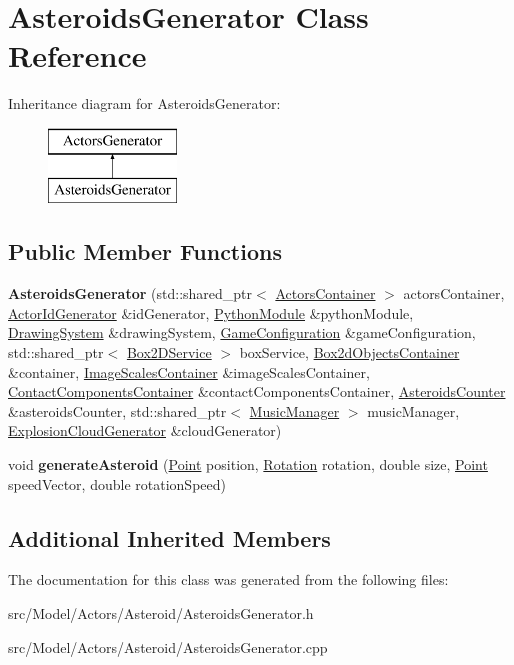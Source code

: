 \hypertarget{classAsteroidsGenerator}{}\section{Asteroids\+Generator Class Reference}
\label{classAsteroidsGenerator}
Inheritance diagram for Asteroids\+Generator\+:\begin{figure}[H]
\begin{center}
\leavevmode
\includegraphics[height=2.000000cm]{classAsteroidsGenerator}
\end{center}
\end{figure}
\subsection*{Public Member Functions}
\begin{DoxyCompactItemize}
\item 
{\bfseries Asteroids\+Generator} (std\+::shared\+\_\+ptr$<$ \hyperlink{classActorsContainer}{Actors\+Container} $>$ actors\+Container, \hyperlink{classActorIdGenerator}{Actor\+Id\+Generator} \&id\+Generator, \hyperlink{classPythonModule}{Python\+Module} \&python\+Module, \hyperlink{classDrawingSystem}{Drawing\+System} \&drawing\+System, \hyperlink{classGameConfiguration}{Game\+Configuration} \&game\+Configuration, std\+::shared\+\_\+ptr$<$ \hyperlink{classBox2DService}{Box2\+D\+Service} $>$ box\+Service, \hyperlink{classBox2dObjectsContainer}{Box2d\+Objects\+Container} \&container, \hyperlink{classImageScalesContainer}{Image\+Scales\+Container} \&image\+Scales\+Container, \hyperlink{classContactComponentsContainer}{Contact\+Components\+Container} \&contact\+Components\+Container, \hyperlink{classAsteroidsCounter}{Asteroids\+Counter} \&asteroids\+Counter, std\+::shared\+\_\+ptr$<$ \hyperlink{classMusicManager}{Music\+Manager} $>$ music\+Manager, \hyperlink{classExplosionCloudGenerator}{Explosion\+Cloud\+Generator} \&cloud\+Generator)\hypertarget{classAsteroidsGenerator_a3fbe934be6652634dde564434e8fe169}{}\label{classAsteroidsGenerator_a3fbe934be6652634dde564434e8fe169}

\item 
void {\bfseries generate\+Asteroid} (\hyperlink{classPoint}{Point} position, \hyperlink{classRotation}{Rotation} rotation, double size, \hyperlink{classPoint}{Point} speed\+Vector, double rotation\+Speed)\hypertarget{classAsteroidsGenerator_a5268e6b8f8ea250427cf6832116c9aa0}{}\label{classAsteroidsGenerator_a5268e6b8f8ea250427cf6832116c9aa0}

\end{DoxyCompactItemize}
\subsection*{Additional Inherited Members}


The documentation for this class was generated from the following files\+:\begin{DoxyCompactItemize}
\item 
src/\+Model/\+Actors/\+Asteroid/Asteroids\+Generator.\+h\item 
src/\+Model/\+Actors/\+Asteroid/Asteroids\+Generator.\+cpp\end{DoxyCompactItemize}
